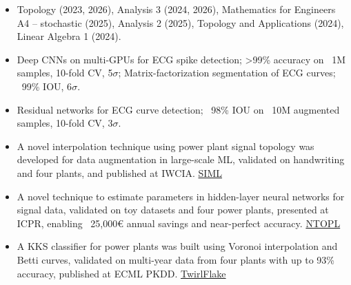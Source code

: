 \documentclass[10pt,a4paper,withhyper]{altacv}
\begin{document}


\makecvheader
{}

\begin{paracol}{2}
\begin{itemize}
    \item Topology (2023, 2026), Analysis 3 (2024, 2026), Mathematics for Engineers A4 – stochastic (2025), Analysis 2 (2025), Topology and Applications (2024), Linear Algebra 1 (2024).
    \end{itemize}
    
\divider

\begin{itemize}[noitemsep]
    \item Deep CNNs on multi-GPUs for ECG spike detection; >99\% accuracy on ~1M samples, 10-fold CV, 5$\sigma$; Matrix-factorization segmentation of ECG curves; ~99\% IOU, 6$\sigma$.
    \item Residual networks for ECG curve detection; ~98\% IOU on ~10M augmented samples, 10-fold CV, 3$\sigma$.
\end{itemize}

\divider

\begin{itemize}[noitemsep]
\item A novel interpolation technique using power plant signal topology was developed for data augmentation in large-scale ML, validated on handwriting and four plants, and published at IWCIA. \href{https://github.com/karhunenloeve/SIML}{SIML \faGithub}
\item A novel technique to estimate parameters in hidden-layer neural networks for signal data, validated on toy datasets and four power plants, presented at ICPR, enabling ~25,000€ annual savings and near-perfect accuracy. \href{https://github.com/karhunenloeve/NTOPL}{NTOPL \faGithub}
\item A KKS classifier for power plants was built using Voronoi interpolation and Betti curves, validated on multi-year data from four plants with up to 93\% accuracy, published at ECML PKDD. \href{https://github.com/karhunenloeve/TwirlFlake}{TwirlFlake \faGithub}
\end{itemize}


\end{paracol}
\end{document}
